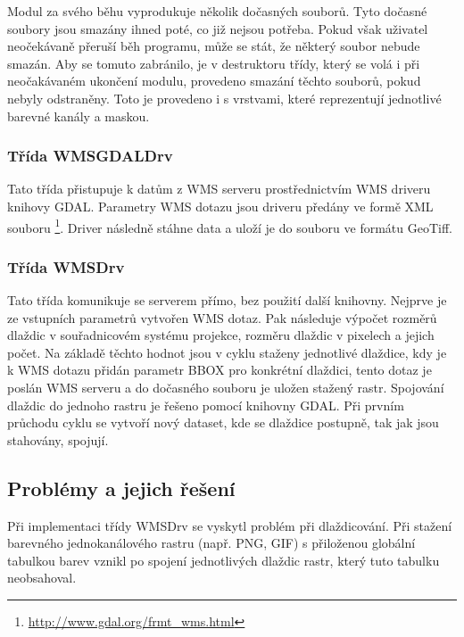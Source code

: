 \documentclass[a4paper,12pt]{article}
\begin{document}
Modul za svého běhu vyprodukuje několik dočasných souborů. Tyto dočasné soubory jsou smazány ihned poté, co již nejsou potřeba. Pokud však uživatel neočekávaně přeruší běh programu, může se stát, že některý soubor nebude smazán. Aby se tomuto zabránilo,
je v destruktoru třídy, který se volá i při neočakávaném ukončení modulu, provedeno smazání těchto souborů, pokud nebyly odstraněny. Toto je provedeno i s vrstvami, které reprezentují jednotlivé barevné kanály a maskou. 





\subsubsection{Třída WMSGDALDrv}

Tato třída přistupuje k datům z WMS serveru prostřednictvím WMS driveru knihovy GDAL. Parametry WMS dotazu jsou driveru předány ve formě XML souboru \footnote{\url{http://www.gdal.org/frmt_wms.html}}. 
Driver následně stáhne data a uloží je do souboru ve formátu GeoTiff. 



\subsubsection{Třída WMSDrv}

Tato třída komunikuje se serverem přímo, bez použití další knihovny. Nejprve je ze vstupních parametrů vytvořen WMS dotaz. 
Pak následuje výpočet rozměrů dlaždic v souřadnicovém systému projekce, rozměru dlaždic v pixelech a jejich počet. Na základě těchto hodnot jsou v cyklu staženy jednotlivé dlaždice, kdy je k WMS dotazu přidán parametr BBOX pro konkrétní dlaždici, tento dotaz je poslán WMS serveru a do dočasného
souboru je uložen stažený rastr. Spojování dlaždic do jednoho rastru je řešeno pomocí knihovny GDAL. Při prvním průchodu cyklu se vytvoří nový dataset, kde se dlaždice postupně, tak jak jsou stahovány, spojují. 

\subsection{Problémy a jejich řešení}

Při implementaci třídy WMSDrv se vyskytl problém při dlaždicování.
Při stažení barevného jednokanálového rastru (např. PNG, GIF) s přiloženou globální tabulkou barev vznikl po spojení jednotlivých dlaždic rastr, který tuto tabulku neobsahoval.
\end{document}

